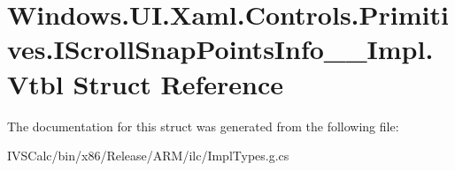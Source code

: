 \hypertarget{struct_windows_1_1_u_i_1_1_xaml_1_1_controls_1_1_primitives_1_1_i_scroll_snap_points_info_____impl_1_1_vtbl}{}\section{Windows.\+U\+I.\+Xaml.\+Controls.\+Primitives.\+I\+Scroll\+Snap\+Points\+Info\+\_\+\+\_\+\+Impl.\+Vtbl Struct Reference}
\label{struct_windows_1_1_u_i_1_1_xaml_1_1_controls_1_1_primitives_1_1_i_scroll_snap_points_info_____impl_1_1_vtbl}


The documentation for this struct was generated from the following file\+:\begin{DoxyCompactItemize}
\item 
I\+V\+S\+Calc/bin/x86/\+Release/\+A\+R\+M/ilc/Impl\+Types.\+g.\+cs\end{DoxyCompactItemize}
